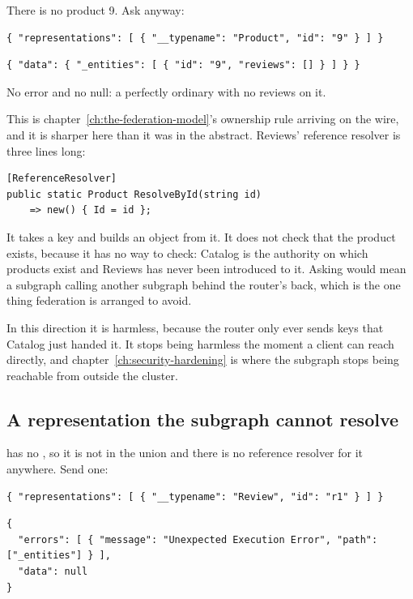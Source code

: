 There is no product 9. Ask anyway:

\begin{verbatim}
{ "representations": [ { "__typename": "Product", "id": "9" } ] }
\end{verbatim}

\begin{verbatim}
{ "data": { "_entities": [ { "id": "9", "reviews": [] } ] } }
\end{verbatim}

No error and no null: a perfectly ordinary  with no reviews on it.

This is chapter~\ref{ch:the-federation-model}'s ownership rule arriving on the
wire, and it is sharper here than it was in the abstract. Reviews' reference
resolver is three lines long:

\begin{verbatim}
[ReferenceResolver]
public static Product ResolveById(string id)
    => new() { Id = id };
\end{verbatim}

It takes a key and builds an object from it. It does not check that the product
exists, because it has no way to check: Catalog is the authority on which
products exist and Reviews has never been introduced to it. Asking would mean a
subgraph calling another subgraph behind the router's back, which is the one
thing federation is arranged to avoid.

In this direction it is harmless, because the router only ever sends keys that
Catalog just handed it. It stops being harmless the moment a client can reach
 directly, and
chapter~\ref{ch:security-hardening} is where the subgraph stops being
reachable from outside the cluster.

\subsection*{A representation the subgraph cannot resolve}

 has no , so it is not in the  union and
there is no reference resolver for it anywhere. Send one:

\begin{verbatim}
{ "representations": [ { "__typename": "Review", "id": "r1" } ] }
\end{verbatim}

\begin{verbatim}
{
  "errors": [ { "message": "Unexpected Execution Error", "path": ["_entities"] } ],
  "data": null
}
\end{verbatim}

